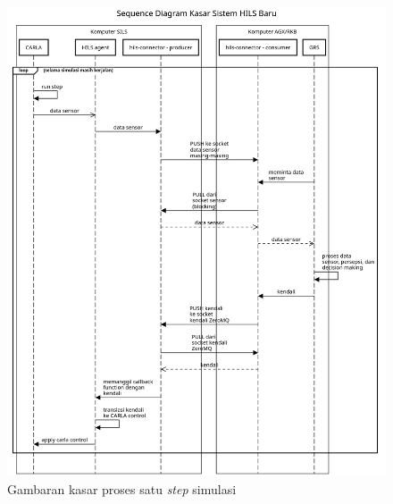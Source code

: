 \begin{figure}[h!]
	\centering
	\includegraphics[width=1.0\textwidth]{resources/chapter-3/sequence-diagram-new-hils-kasar.png}
	\caption{Gambaran kasar proses satu \textit{step} simulasi}
	\label{chapter-3-new-sequence}
\end{figure}
